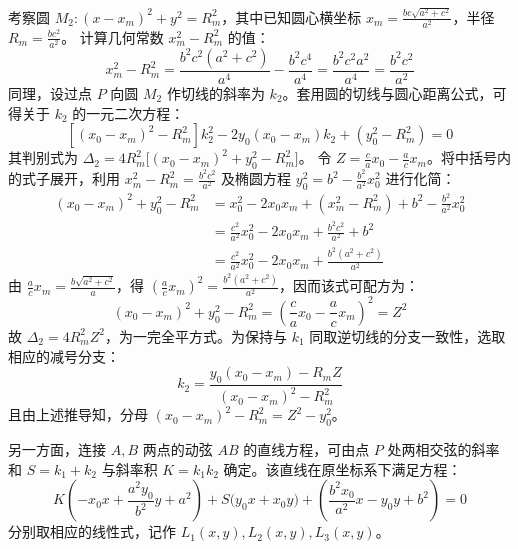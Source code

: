 \begin{solution}
考察圆 $M_2: (x - x_m)^2 + y^2 = R_m^2$，其中已知圆心横坐标 $x_m = \frac{bc\sqrt{a^2+c^2}}{a^2}$，半径 $R_m = \frac{bc^2}{a^2}$。
计算几何常数 $x_m^2 - R_m^2$ 的值：
\[ x_m^2 - R_m^2 = \frac{b^2 c^2(a^2+c^2)}{a^4} - \frac{b^2 c^4}{a^4} = \frac{b^2 c^2 a^2}{a^4} = \frac{b^2 c^2}{a^2} \]
同理，设过点 $P$ 向圆 $M_2$ 作切线的斜率为 $k_2$。套用圆的切线与圆心距离公式，可得关于 $k_2$ 的一元二次方程：
\[ [(x_0 - x_m)^2 - R_m^2] k_2^2 - 2y_0(x_0 - x_m) k_2 + (y_0^2 - R_m^2) = 0 \]
其判别式为 $\Delta_2 = 4R_m^2 \big[ (x_0 - x_m)^2 + y_0^2 - R_m^2 \big]$。
令 $Z = \frac{c}{a}x_0 - \frac{a}{c}x_m$。将中括号内的式子展开，利用 $x_m^2 - R_m^2 = \frac{b^2 c^2}{a^2}$ 及椭圆方程 $y_0^2 = b^2 - \frac{b^2}{a^2}x_0^2$ 进行化简：
\begin{align*}
(x_0 - x_m)^2 + y_0^2 - R_m^2 &= x_0^2 - 2x_0 x_m + (x_m^2 - R_m^2) + b^2 - \frac{b^2}{a^2}x_0^2 \\
&= \frac{c^2}{a^2}x_0^2 - 2x_0 x_m + \frac{b^2 c^2}{a^2} + b^2 \\
&= \frac{c^2}{a^2}x_0^2 - 2x_0 x_m + \frac{b^2(a^2+c^2)}{a^2}
\end{align*}
由 $\frac{a}{c}x_m = \frac{b\sqrt{a^2+c^2}}{a}$，得 $\left(\frac{a}{c}x_m\right)^2=\frac{b^2(a^2+c^2)}{a^2}$，因而该式可配方为：
\[ (x_0 - x_m)^2 + y_0^2 - R_m^2 = \left( \frac{c}{a}x_0 - \frac{a}{c}x_m \right)^2 = Z^2 \]
故 $\Delta_2 = 4R_m^2 Z^2$，为一完全平方式。为保持与 $k_1$ 同取逆切线的分支一致性，选取相应的减号分支：
\[ k_2 = \frac{y_0(x_0 - x_m) - R_m Z}{(x_0 - x_m)^2 - R_m^2} \]
且由上述推导知，分母 $(x_0 - x_m)^2 - R_m^2 = Z^2 - y_0^2$。

另一方面，连接 $A, B$ 两点的动弦 $AB$ 的直线方程，可由点 $P$ 处两相交弦的斜率和 $S = k_1 + k_2$ 与斜率积 $K = k_1 k_2$ 确定。该直线在原坐标系下满足方程：
\[ K \left( -x_0 x + \frac{a^2 y_0}{b^2} y + a^2 \right) + S \big( y_0 x + x_0 y \big) + \left( \frac{b^2 x_0}{a^2} x - y_0 y + b^2 \right) = 0 \]
分别取相应的线性式，记作 $L_1(x, y), L_2(x, y), L_3(x, y)$。


\end{solution}
